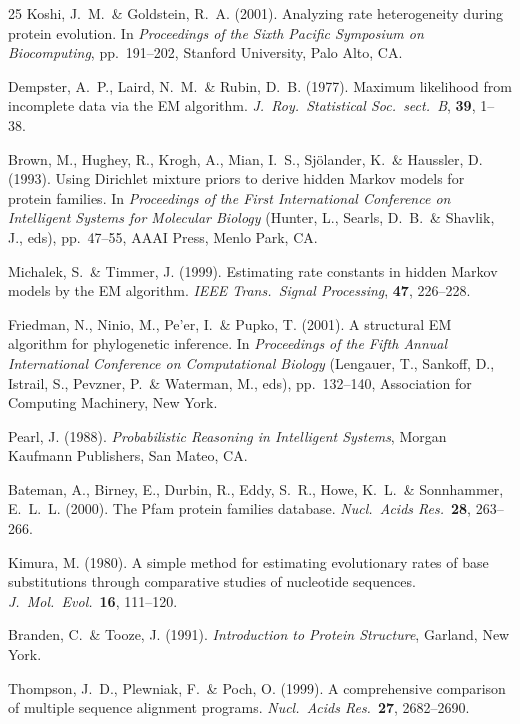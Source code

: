 \documentclass[12pt]{article}
\begin{document}
\begin{thebibliography}{25}
Koshi, J.~M.\ \& Goldstein, R.~A. (2001). Analyzing rate heterogeneity during protein evolution. In
\textit{Proceedings of the Sixth Pacific Symposium on Biocomputing}, pp.~191--202, Stanford
University, Palo Alto, CA.

Dempster, A.~P., Laird, N.~M.\ \& Rubin, D.~B. (1977). Maximum likelihood from incomplete data via
the EM algorithm. \textit{J.\ Roy.\ Statistical Soc.\ sect.\ B}, \textbf{39}, 1--38.

Brown, M., Hughey, R., Krogh, A., Mian, I.~S., Sj\"olander, K.\ \& Haussler, D. (1993). Using
Dirichlet mixture priors to derive hidden Markov models for protein families. In \textit{Proceedings
of the First International Conference on Intelligent Systems for Molecular Biology} (Hunter, L.,
Searls, D.~B.\ \& Shavlik, J., eds), pp.~47--55, AAAI Press, Menlo Park, CA.

Michalek, S.\ \& Timmer, J. (1999). Estimating rate constants in hidden Markov models by the EM
algorithm. \textit{IEEE Trans.\ Signal Processing}, \textbf{47}, 226--228.

Friedman, N., Ninio, M., Pe'er, I.\ \& Pupko, T. (2001). A structural EM algorithm for phylogenetic
inference. In \textit{Proceedings of the Fifth Annual International Conference on Computational
Biology} (Lengauer, T., Sankoff, D., Istrail, S., Pevzner, P.\ \& Waterman, M., eds), pp.~132--140,
Association for Computing Machinery, New York.

Pearl, J. (1988). \textit{Probabilistic Reasoning in Intelligent Systems}, Morgan Kaufmann
Publishers, San Mateo, CA.

Bateman, A., Birney, E., Durbin, R., Eddy, S.~R., Howe, K.~L.\ \& Sonnhammer, E.~L.~L. (2000).
The Pfam protein families database. \textit{Nucl.\ Acids Res.}\ \textbf{28}, 263--266.

Kimura, M. (1980). A simple method for estimating evolutionary rates of base substitutions through
comparative studies of nucleotide sequences. \textit{J.\ Mol.\ Evol.}\ \textbf{16}, 111--120.

Branden, C.\ \& Tooze, J. (1991). \textit{Introduction to Protein Structure}, Garland, New York.

Thompson, J.~D., Plewniak, F.\ \& Poch, O. (1999). A comprehensive comparison of multiple sequence
alignment programs. \textit{Nucl.\ Acids Res.}\ \textbf{27}, 2682--2690.


\end{thebibliography}
\end{document}

